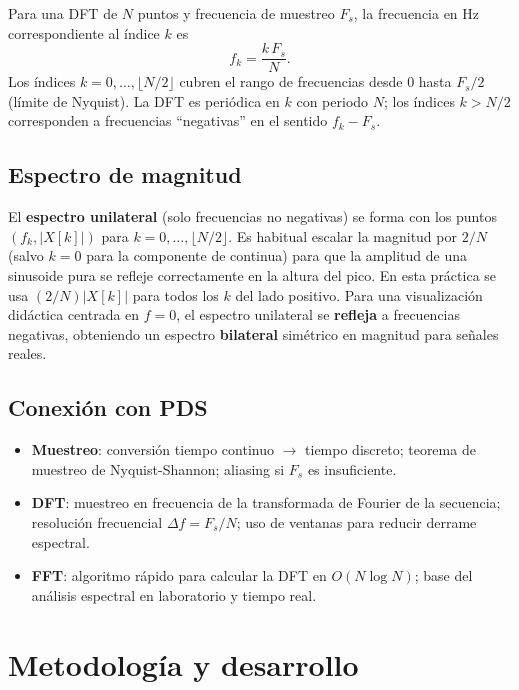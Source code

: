 \documentclass[12pt,a4paper]{article}
\begin{document}
Para una DFT de \(N\) puntos y frecuencia de muestreo \(F_s\), la frecuencia en Hz correspondiente al índice \(k\) es
\begin{equation}
  f_k = \frac{k\,F_s}{N}.
\end{equation}
Los índices \(k = 0, \ldots, \lfloor N/2 \rfloor\) cubren el rango de frecuencias desde 0 hasta \(F_s/2\) (límite de Nyquist). La DFT es periódica en \(k\) con periodo \(N\); los índices \(k > N/2\) corresponden a frecuencias ``negativas'' en el sentido \(f_k - F_s\).

\subsection{Espectro de magnitud}

El \textbf{espectro unilateral} (solo frecuencias no negativas) se forma con los puntos \((f_k, |X[k]|)\) para \(k = 0, \ldots, \lfloor N/2 \rfloor\). Es habitual escalar la magnitud por \(2/N\) (salvo \(k=0\) para la componente de continua) para que la amplitud de una sinusoide pura se refleje correctamente en la altura del pico. En esta práctica se usa \((2/N)|X[k]|\) para todos los \(k\) del lado positivo. Para una visualización didáctica centrada en \(f=0\), el espectro unilateral se \textbf{refleja} a frecuencias negativas, obteniendo un espectro \textbf{bilateral} simétrico en magnitud para señales reales.

\subsection{Conexión con PDS}

\begin{itemize}
  \item \textbf{Muestreo}: conversión tiempo continuo $\to$ tiempo discreto; teorema de muestreo de Nyquist-Shannon; aliasing si \(F_s\) es insuficiente.
  \item \textbf{DFT}: muestreo en frecuencia de la transformada de Fourier de la secuencia; resolución frecuencial \(\Delta f = F_s/N\); uso de ventanas para reducir derrame espectral.
  \item \textbf{FFT}: algoritmo rápido para calcular la DFT en \(O(N\log N)\); base del análisis espectral en laboratorio y tiempo real.
\end{itemize}

\section{Metodología y desarrollo}
\end{document}
